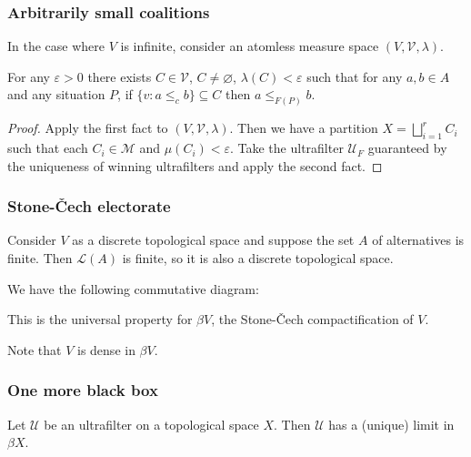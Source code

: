 \documentclass{beamer}
\theoremstyle{definition}
\begin{document}
\begin{frame}
    \frametitle{Arbitrarily small coalitions}

    In the case where $V$ is infinite, consider an atomless measure space $(V, \mathcal{V}, \lambda)$.

    \begin{theorem}
        For any $\varepsilon > 0$ there exists $C \in \mathcal{V}$, $C \neq \varnothing$, $\lambda(C) < \varepsilon$ such that for any $a, b \in A$
        and any situation $P$, if $\{v : a \leq_c b\} \subseteq C$ then $a \leq_{F(P)} b$.
    \end{theorem}

    \begin{proof}
        Apply the first fact to $(V, \mathcal{V}, \lambda)$. Then we have a partition $X = \bigsqcup_{i=1}^r C_i$ such that each $C_i \in \mathcal{M}$
        and $\mu(C_i) < \varepsilon$. Take the ultrafilter $\mathcal{U}_F$ guaranteed by the uniqueness of winning ultrafilters and apply the second fact.
    \end{proof}

\end{frame}

\begin{frame}
    \frametitle{Stone-\v{C}ech electorate}

    Consider $V$ as a discrete topological space and suppose the set $A$ of alternatives is finite. Then $\mathcal{L}(A)$ is finite, so it is also
    a discrete topological space.

    We have the following commutative diagram:
    \begin{center}
    \end{center}
    This is the universal property for $\mathit{\beta V}$, the Stone-\v{C}ech compactification of $V$.

    Note that $V$ is dense in $\mathit{\beta V}$.

\end{frame}

\begin{frame}
    \frametitle{One more black box}

    \begin{fact}
        Let $\mathcal{U}$ be an ultrafilter on a topological space $X$. Then $\mathcal{U}$ has a (unique) limit in $\mathit{\beta X}$.
    \end{fact}

\end{frame}
\end{document}
